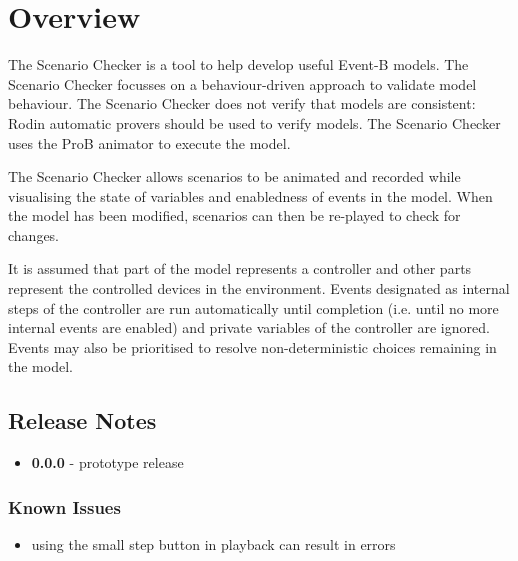 \section{Overview}
\label{sec:overview}

The Scenario Checker is a tool to help develop useful Event-B models.
The Scenario Checker focusses on a behaviour-driven approach to validate model behaviour.
The Scenario Checker does not verify that models are consistent: Rodin automatic provers should be used to verify models.
The Scenario Checker uses the ProB animator to execute the model.

The Scenario Checker allows scenarios to be animated and recorded while visualising the state of variables and enabledness of events in the model.
When the model has been modified, scenarios can then be re-played to check for changes.

It is assumed that part of the model represents a controller and other parts represent the controlled devices in the environment.
Events designated as internal steps of the controller are run automatically until completion (i.e. until no more internal events are enabled) and private variables of the controller are ignored.
Events may also be prioritised to resolve non-deterministic choices remaining in the model.

\subsection{Release Notes}
\label{sec:release-notes}

\begin{itemize}
	\item \textbf{0.0.0} - prototype release
\end{itemize}

\subsubsection{Known Issues}
\label{sec:known-issues}

\begin{itemize}
	\item using the small step button in playback can result in errors
\end{itemize}


